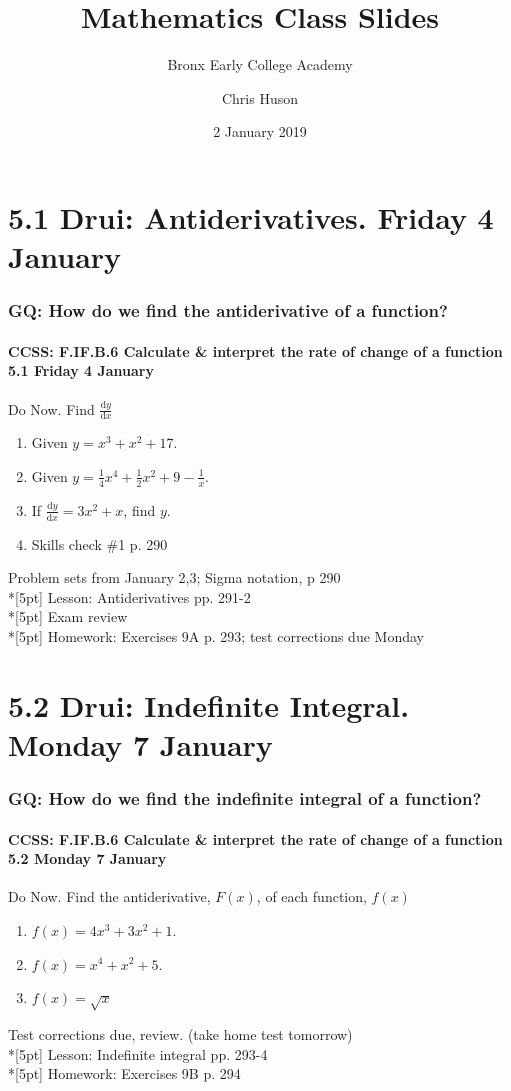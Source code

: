 \documentclass{beamer}
\title{Mathematics Class Slides}
\subtitle{Bronx Early College Academy}
\author{Chris Huson}
\date{2 January 2019}
\begin{document}
\frame{\titlepage}


\section{5.1 Drui: Antiderivatives. Friday 4 January}
\frame
{
  \frametitle{GQ: How do we find the antiderivative of a function?}
  \framesubtitle{CCSS: F.IF.B.6 Calculate \& interpret the rate of change of a function  \alert{5.1 Friday 4 January}}

  \begin{block}{Do Now. Find $\frac{\mathrm{d}y}{\mathrm{d}x}$}
  \begin{enumerate}
      \item Given $y=x^3+x^2+17$.
      \item Given $y=\frac{1}{4}x^4+\frac{1}{2}x^2+9-\frac{1}{x}$.
      \item If $\displaystyle \frac{\mathrm{d}y}{\mathrm{d}x}=3x^2+x$, find $y$.
      \item Skills check \#1 p. 290
  \end{enumerate}
  \end{block}
  Problem sets from January 2,3; Sigma notation, p 290 \\*[5pt]
  Lesson: Antiderivatives pp. 291-2\\*[5pt]
  Exam review \\*[5pt]
  Homework: Exercises 9A p. 293; test corrections due Monday
}

\section{5.2 Drui: Indefinite Integral. Monday 7 January}
\frame
{
  \frametitle{GQ: How do we find the indefinite integral of a function?}
  \framesubtitle{CCSS: F.IF.B.6 Calculate \& interpret the rate of change of a function  \alert{5.2 Monday 7 January}}

  \begin{block}{Do Now. Find the antiderivative, $F(x)$, of each function, $f(x)$}
  \begin{enumerate}
      \item $f(x)=4x^3+3x^2+1$.
      \item $f(x)=x^4+x^2+5$.
      \item $f(x)= \sqrt{x}$
  \end{enumerate}
  \end{block}
  Test corrections due, review. (take home test tomorrow)\\*[5pt]
  Lesson: Indefinite integral pp. 293-4\\*[5pt]
  Homework: Exercises 9B p. 294
}
\end{document}
